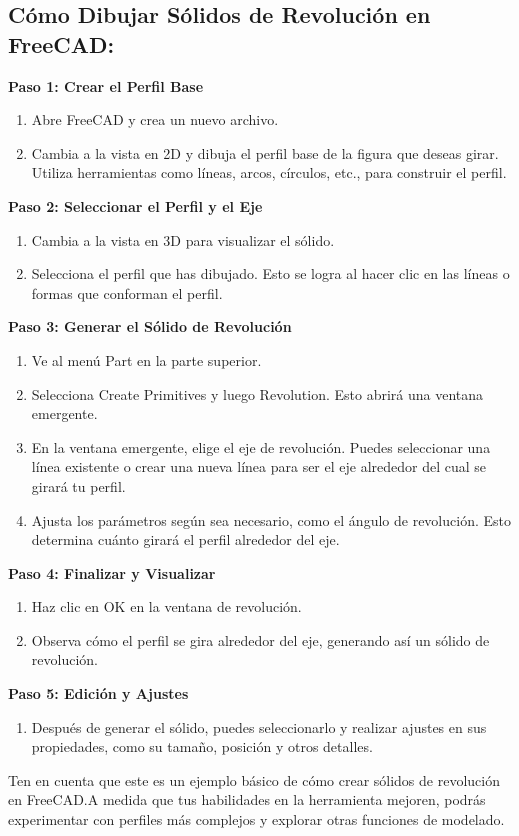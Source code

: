 \documentclass[../main]{subfiles}
\begin{document}
\subsection{Cómo Dibujar Sólidos de Revolución en FreeCAD:}
\textbf{Paso 1: Crear el Perfil Base}
\begin{enumerate}
  \item Abre FreeCAD y crea un nuevo archivo.
  \item Cambia a la vista en 2D y dibuja el perfil base de la figura
    que deseas girar. Utiliza herramientas como líneas, arcos,
    círculos, etc., para construir el perfil.
\end{enumerate}
\textbf{Paso 2: Seleccionar el Perfil y el Eje}
\begin{enumerate}
  \item Cambia a la vista en 3D para visualizar el sólido.
  \item Selecciona el perfil que has dibujado. Esto se logra al hacer
    clic en las líneas o formas que conforman el perfil.
\end{enumerate}
\textbf{Paso 3: Generar el Sólido de Revolución}
\begin{enumerate}
  \item Ve al menú Part en la parte superior.
  \item Selecciona Create Primitives y luego Revolution. Esto abrirá
    una ventana emergente.
  \item En la ventana emergente, elige el eje de revolución. Puedes
    seleccionar una línea existente o crear una nueva línea para ser
    el eje alrededor del cual se girará tu perfil.
  \item Ajusta los parámetros según sea necesario, como el ángulo de
    revolución. Esto determina cuánto girará el perfil alrededor del eje.
\end{enumerate}
\textbf{Paso 4: Finalizar y Visualizar}
\begin{enumerate}
  \item Haz clic en OK en la ventana de revolución.
  \item Observa cómo el perfil se gira alrededor del eje, generando
    así un sólido de revolución.
\end{enumerate}
\textbf{Paso 5: Edición y Ajustes}
\begin{enumerate}
  \item Después de generar el sólido, puedes seleccionarlo y realizar
    ajustes en sus propiedades, como su tamaño, posición y otros detalles.
\end{enumerate}
Ten en cuenta que este es un ejemplo básico de cómo crear sólidos de
revolución en FreeCAD.\@ A medida que tus habilidades en la herramienta
mejoren, podrás experimentar con perfiles más complejos y explorar
otras funciones de modelado.
\end{document}
